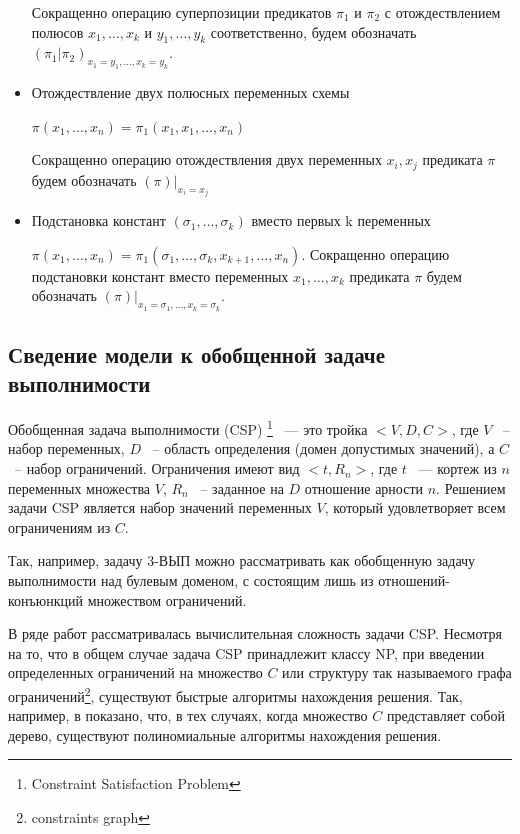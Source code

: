 \documentclass[12pt]{article}
\newenvironment{definition}[1][Определение]{\begin{trivlist}
\item[\hskip \labelsep {\bfseries #1}]}{\end{trivlist}}
\begin{document}
\begin{definition}
\begin{itemize}
    Сокращенно операцию суперпозиции предикатов $\pi_1$ и $\pi_2$ с отождествлением полюсов 
    $x_1, \dots, x_k$ и $y_1, \dots, y_k$ соответственно, будем обозначать $(\pi_1|\pi_2)_{x_1=y_1, \dots, x_k=y_k}$.

    \item Отождествление двух полюсных переменных схемы

    $\pi(x_1, \dots, x_n) = \pi_1(x_1, x_1, \dots, x_n)$

    Сокращенно операцию отождествления двух переменных $x_i, x_j$ предиката $\pi$ будем обозначать 
    $(\pi)|_{x_i=x_j}$

    \item Подстановка констант $(\sigma_1, \dots, \sigma_k)$ вместо первых k переменных

    $\pi(x_1, \dots, x_n) = \pi_1(\sigma_1, \dots, \sigma_k, x_{k+1}, \dots, x_n)$. 
    Сокращенно операцию подстановки констант вместо переменных $x_1, \dots, x_k$ предиката $\pi$
    будем обозначать $(\pi)|_{x_1=\sigma_1, \dots, x_k=\sigma_k}$.

\end{itemize}
\end{definition}
\subsection{Сведение модели к обобщенной задаче выполнимости}

\begin{definition}
Обобщенная задача выполнимости (CSP) \footnote{Constraint Satisfaction Problem} 
~--- это тройка $<V,D,C>$, где $V$ ~-- набор переменных, $D$ ~-- область определения (домен допустимых значений), 
а $C$ ~-- набор ограничений. Ограничения имеют вид $<t, R_n>$, где $t$ ~--- кортеж из $n$ переменных множества $V$, 
$R_n$ ~-- заданное на $D$ отношение арности $n$. 
Решением задачи CSP является набор значений переменных $V$, который удовлетворяет всем ограничениям из $C$. 
\end{definition}

Так, например, задачу 3-ВЫП можно рассматривать как обобщенную задачу выполнимости над булевым доменом, с 
состоящим лишь из отношений-конъюнкций множеством ограничений.

В ряде работ рассматривалась вычислительная сложность задачи CSP. Несмотря на то, что в общем случае задача CSP
принадлежит классу NP, при введении определенных ограничений на множество $C$ или структуру так называемого
графа ограничений\footnote{constraints graph}, существуют быстрые алгоритмы нахождения решения. 
Так, например, в \cite{Shaeffer78} показано, 
что, в тех случаях, когда множество $C$ представляет собой дерево, существуют полиномиальные алгоритмы нахождения решения.
\end{document}
